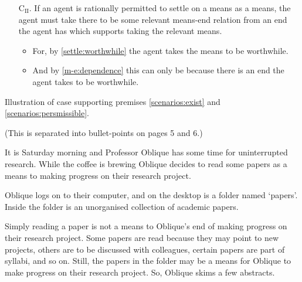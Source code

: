 \documentclass[10pt]{article}
\newcommand{\hozlinedash}[0]{%
  \noindent\hdashrule[0.5ex][c]{\textwidth}{.1pt}{2.5pt}
}
\begin{document}
\begin{enumerate}[label=\arabic*., ref=(\arabic*)]
\item[C\(_{\text{II}}\).] \label{together} If an agent is rationally permitted to settle on a means as a means, the agent must take there to be some relevant means-end relation from an end the agent has which supports taking the relevant means.
  \begin{itemize}
  \item For, by \ref{settle:worthwhile} the agent takes the means to be worthwhile.
  \item And by \ref{m-e:dependence} this can only be because there is an end the agent takes to be worthwhile.
  \end{itemize}
\end{enumerate}


\newpage

Illustration of case supporting premises \ref{scenarios:exist} and \ref{scenarios:persmissible}.

(This is separated into bullet-points on pages 5 and 6.)

\hozlinedash

It is Saturday morning and Professor Oblique has some time for uninterrupted research.
While the coffee is brewing Oblique decides to read some papers as a means to making progress on their research project.

Oblique logs on to their computer, and on the desktop is a folder named `papers'.
Inside the folder is an unorganised collection of academic papers.

Simply reading a paper is not a means to Oblique's end of making progress on their research project.
Some papers are read because they may point to new projects, others are to be discussed with colleagues, certain papers are part of syllabi, and so on.
Still, the papers in the folder may be a means for Oblique to make progress on their research project.
So, Oblique skims a few abstracts.
\end{document}
